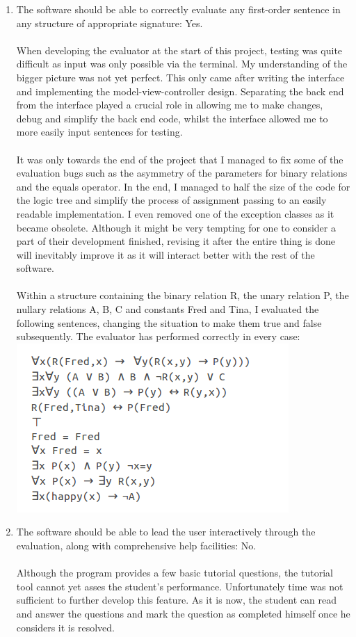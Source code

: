 \documentclass{report}
\begin{document}
\begin{enumerate}
\item The software should be able to correctly evaluate any first-order sentence 
in any structure of appropriate signature: Yes.
\\ \\
When developing the evaluator at the start of this project, testing was quite 
difficult as input was only possible via the terminal. My understanding of the 
bigger picture was not yet perfect. This only came after writing the interface 
and implementing the model-view-controller design. Separating the back end from 
the interface played a crucial role in allowing me to make changes, debug and 
simplify the back end code, whilst the interface allowed me to more easily input 
sentences for testing. 
\\ \\
It was only towards the end of the project that I managed to fix some of the 
evaluation bugs such as the asymmetry of the parameters for binary relations and 
the equals operator. In the end, I managed to half the size of the code for the 
logic tree and simplify the process of assignment passing to an easily readable 
implementation. I even removed one of the exception classes as it became 
obsolete. Although it might be very tempting for one to consider a part of their 
development finished, revising it after the entire thing is done will inevitably 
improve it as it will interact better with the rest of the software.
\\ \\
Within a structure containing the binary relation R, the unary relation P, the 
nullary relations A, B, C and constants Fred and Tina, I evaluated the following 
sentences, changing the situation to make them true and false subsequently. The 
evaluator has performed correctly in every case:
\includegraphics[scale=0.5]{testing.png}

\item The software should be able to lead the user interactively through the 
evaluation, along with comprehensive help facilities: No. 
\\ \\
Although the program provides a few basic tutorial questions, the tutorial tool 
cannot yet asses the student's performance. Unfortunately time was not 
sufficient to further develop this feature. As it is now, the student can read 
and answer the questions and mark the question as completed himself once he 
considers it is resolved. 


\end{enumerate}
\end{document}
